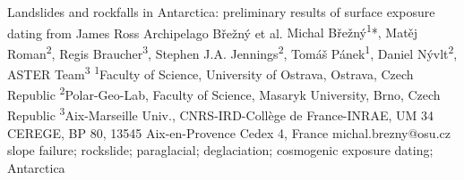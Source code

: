 \abstract
{Landslides and rockfalls in Antarctica: preliminary results of surface exposure dating from James Ross Archipelago} 
{Břežný et al.} 
{Michal Břežný\textsuperscript{1}*, Matěj Roman\textsuperscript{2}, Regis Braucher\textsuperscript{3}, Stephen J.A. Jennings\textsuperscript{2}, Tomáš Pánek\textsuperscript{1}, Daniel Nývlt\textsuperscript{2}, ASTER Team\textsuperscript{3}} 
{\TLtag} 
{
\textsuperscript{1}Faculty of Science, University of Ostrava, Ostrava, Czech Republic
\textsuperscript{2}Polar-Geo-Lab, Faculty of Science, Masaryk University, Brno, Czech Republic
\textsuperscript{3}Aix-Marseille Univ., CNRS-IRD-Collège de France-INRAE, UM 34 CEREGE, BP 80, 13545 Aix-en-Provence Cedex 4, France
}
{michal.brezny@osu.cz}  %
{slope failure; rockslide; paraglacial; deglaciation; cosmogenic exposure dating; Antarctica}
